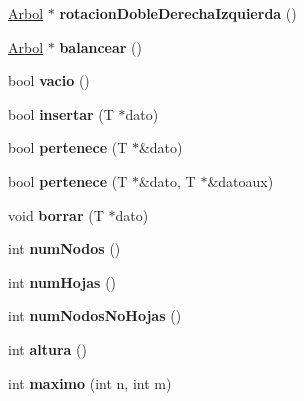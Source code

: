 \begin{CompactItemize}
\item 
\hypertarget{classArbol_3_01T_01_5_01_4_fabde49f6792766f28a69a41b77c63d2}{
\hyperlink{classArbol}{Arbol} $\ast$ \textbf{rotacionDobleDerechaIzquierda} ()}
\label{classArbol_3_01T_01_5_01_4_fabde49f6792766f28a69a41b77c63d2}

\item 
\hypertarget{classArbol_3_01T_01_5_01_4_b72c00180ab05f46a5d6d0312965bec6}{
\hyperlink{classArbol}{Arbol} $\ast$ \textbf{balancear} ()}
\label{classArbol_3_01T_01_5_01_4_b72c00180ab05f46a5d6d0312965bec6}

\item 
\hypertarget{classArbol_3_01T_01_5_01_4_c3692f69ca319cfe47992773340d919a}{
bool \textbf{vacio} ()}
\label{classArbol_3_01T_01_5_01_4_c3692f69ca319cfe47992773340d919a}

\item 
\hypertarget{classArbol_3_01T_01_5_01_4_c81800f97f3f886c4476286641a9b85b}{
bool \textbf{insertar} (T $\ast$dato)}
\label{classArbol_3_01T_01_5_01_4_c81800f97f3f886c4476286641a9b85b}

\item 
\hypertarget{classArbol_3_01T_01_5_01_4_2cdfe78ecc75310e79a8670ecee3432f}{
bool \textbf{pertenece} (T $\ast$\&dato)}
\label{classArbol_3_01T_01_5_01_4_2cdfe78ecc75310e79a8670ecee3432f}

\item 
\hypertarget{classArbol_3_01T_01_5_01_4_b7a0464d8dc0ffcb08d7e4d617e9fa25}{
bool \textbf{pertenece} (T $\ast$\&dato, T $\ast$\&datoaux)}
\label{classArbol_3_01T_01_5_01_4_b7a0464d8dc0ffcb08d7e4d617e9fa25}

\item 
\hypertarget{classArbol_3_01T_01_5_01_4_60caad0df0dd33ed903c55600bdbeec8}{
void \textbf{borrar} (T $\ast$dato)}
\label{classArbol_3_01T_01_5_01_4_60caad0df0dd33ed903c55600bdbeec8}

\item 
\hypertarget{classArbol_3_01T_01_5_01_4_16d2e7376c1d58d0c7b8c80e9590552b}{
int \textbf{numNodos} ()}
\label{classArbol_3_01T_01_5_01_4_16d2e7376c1d58d0c7b8c80e9590552b}

\item 
\hypertarget{classArbol_3_01T_01_5_01_4_8c6c2a54599ec4706360dfc6c0b57de3}{
int \textbf{numHojas} ()}
\label{classArbol_3_01T_01_5_01_4_8c6c2a54599ec4706360dfc6c0b57de3}

\item 
\hypertarget{classArbol_3_01T_01_5_01_4_f1606923cd786c5f5a6c6179f98ca0ec}{
int \textbf{numNodosNoHojas} ()}
\label{classArbol_3_01T_01_5_01_4_f1606923cd786c5f5a6c6179f98ca0ec}

\item 
\hypertarget{classArbol_3_01T_01_5_01_4_8da2dd1419c25d37816b7d4a064388cc}{
int \textbf{altura} ()}
\label{classArbol_3_01T_01_5_01_4_8da2dd1419c25d37816b7d4a064388cc}

\item 
\hypertarget{classArbol_3_01T_01_5_01_4_6ea770927e68a34d35117b3f7a050c84}{
int \textbf{maximo} (int n, int m)}
\label{classArbol_3_01T_01_5_01_4_6ea770927e68a34d35117b3f7a050c84}

\end{CompactItemize}


